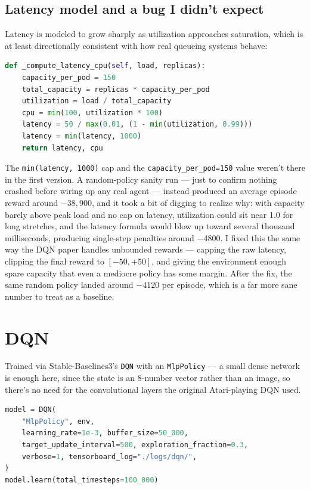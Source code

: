 \documentclass{rapportINPTCLOUD}
\begin{document}
\subsection{Latency model and a bug I didn't expect}

Latency is modeled to grow sharply as utilization approaches saturation, which is at least directionally consistent with how real queueing systems behave:
\begin{lstlisting}[language=Python]
def _compute_latency_cpu(self, load, replicas):
    capacity_per_pod = 150
    total_capacity = replicas * capacity_per_pod
    utilization = load / total_capacity
    cpu = min(100, utilization * 100)
    latency = 50 / max(0.01, (1 - min(utilization, 0.99)))
    latency = min(latency, 1000)
    return latency, cpu
\end{lstlisting}
The \texttt{min(latency, 1000)} cap and the \texttt{capacity\_per\_pod=150} value weren't there in the first version. A random-policy sanity run — just to confirm nothing crashed before wiring up any real agent — instead produced an average episode reward around $-38{,}900$, and it took a bit of digging to realize why: with capacity barely above peak load and no cap on latency, utilization could sit near 1.0 for long stretches, and the latency formula would blow up toward several thousand milliseconds, producing single-step penalties around $-4800$. I fixed this the same way the DQN paper handles unbounded rewards — capping the raw latency, clipping the final reward to $[-50,+50]$, and giving the environment enough spare capacity that even a mediocre policy has some margin. After the fix, the same random policy landed around $-4120$ per episode, which is a far more sane number to treat as a baseline.

\section{DQN}

Trained via Stable-Baselines3's \texttt{DQN} with an \texttt{MlpPolicy} — a small dense network is enough here, since the state is an 8-number vector rather than an image, so there's no need for the convolutional layers the original Atari-playing DQN used.

\begin{lstlisting}[language=Python]
model = DQN(
    "MlpPolicy", env,
    learning_rate=1e-3, buffer_size=50_000,
    target_update_interval=500, exploration_fraction=0.3,
    verbose=1, tensorboard_log="./logs/dqn/",
)
model.learn(total_timesteps=100_000)
\end{lstlisting}
\end{document}
